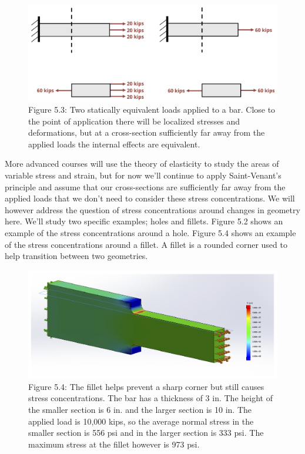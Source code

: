 \documentclass[
  letterpaper,
  DIV=11,
  numbers=noendperiod]{scrreprt}
\theoremstyle{definition}
\theoremstyle{remark}
\begin{document}
\begin{figure}[H]

{\centering \includegraphics[width=5.88542in,height=\textheight]{images/PNGs/Figure 5.3.png}

}

\caption{Figure 5.3: Two statically equivalent loads applied to a bar.
Close to the point of application there will be localized stresses and
deformations, but at a cross-section sufficiently far away from the
applied loads the internal effects are equivalent.}

\end{figure}%

More advanced courses will use the theory of elasticity to study the
areas of variable stress and strain, but for now we'll continue to apply
Saint-Venant's principle and assume that our cross-sections are
sufficiently far away from the applied loads that we don't need to
consider these stress concentrations. We will however address the
question of stress concentrations around changes in geometry here. We'll
study two specific examples; holes and fillets. Figure 5.2 shows an
example of the stress concentrations around a hole. Figure 5.4 shows an
example of the stress concentrations around a fillet. A fillet is a
rounded corner used to help transition between two geometries.

\begin{figure}[H]

{\centering \includegraphics{images/PNGs/Figure 5.4.png}

}

\caption{Figure 5.4: The fillet helps prevent a sharp corner but still
causes stress concentrations. The bar has a thickness of 3 in. The
height of the smaller section is 6 in. and the larger section is 10 in.
The applied load is 10,000 kips, so the average normal stress in the
smaller section is 556 psi and in the larger section is 333 psi. The
maximum stress at the fillet however is 973 psi.}

\end{figure}%
\end{document}
